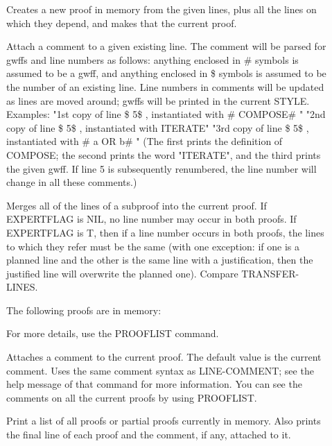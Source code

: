 \begin{description} 
\item[\parbox{\textwidth}{CREATE-SUBPROOF \textit{lines} \textit{subname}}]  
Creates a new proof in memory from the given lines,
plus all the lines on which they depend, and makes that 
the current proof.

\item[\parbox{\textwidth}{LINE-COMMENT \textit{line} \textit{comment}}]  
Attach a comment to a given existing line.
The comment will be parsed for gwffs and line numbers
as follows: anything enclosed in \#  symbols is assumed to
be a gwff, and anything enclosed in \$  symbols is assumed
to be the number of an existing line. Line numbers in 
comments will be updated as lines are moved around;
gwffs will be printed in the current STYLE.
Examples:
"1st copy of line \$ 5\$ , instantiated with \# COMPOSE\# "
"2nd copy of line \$ 5\$ , instantiated with ITERATE"
"3rd copy of line \$ 5\$ , instantiated with \# a OR b\# "
(The first prints the definition of COMPOSE; the
second prints the word "ITERATE", and the third prints
the given gwff. If line 5 is subsequently renumbered, 
the line number will change in all these comments.)

\item[\parbox{\textwidth}{MERGE-PROOFS \textit{proof} \textit{subproof}}]  
Merges all of the lines of a subproof into the current 
proof. If EXPERTFLAG is NIL, no line number may occur in both proofs.
If EXPERTFLAG is T, then if a line number occurs in both proofs, the 
lines to which they refer must be the same (with one exception: if 
one is a planned line and the other is the same line with a 
justification, then the justified line will overwrite the planned one).
Compare TRANSFER-LINES.

The following proofs are in memory:

For more details, use the PROOFLIST command.


\item[\parbox{\textwidth}{PROOF-COMMENT \textit{comment}}]  
Attaches a comment to the current proof.
The default value is the current comment. Uses the same
comment syntax as LINE-COMMENT; see the help message of that command
for more information. You can see the comments on all the 
current proofs by using PROOFLIST.

\item[\parbox{\textwidth}{PROOFLIST}]  
Print a list of all proofs or partial proofs currently in memory.
Also prints the final line of each proof and the comment, if
any, attached to it.


\end{description}
